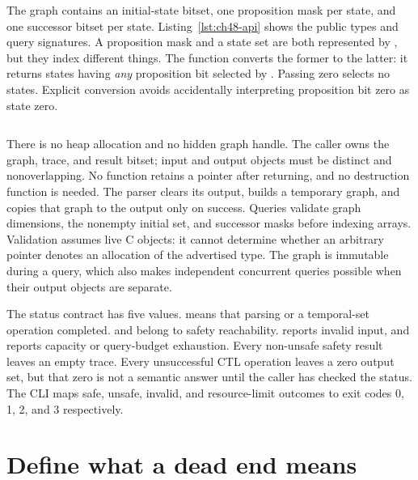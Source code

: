 The graph contains an initial-state bitset, one proposition mask per state, and one successor bitset per state.
Listing~\ref{lst:ch48-api} shows the public types and query signatures.
A proposition mask and a state set are both represented by , but they index different things.
The function  converts the former to the latter: it returns states having \emph{any} proposition bit selected by .
Passing zero selects no states.
Explicit conversion avoids accidentally interpreting proposition bit zero as state zero.

\begin{listing}[htbp]
  \inputminted[firstline=9,lastline=32]{c}{example-code/model-checker/checker.h}
  \caption{Caller-owned fixed-size objects make graph and trace lifetimes explicit.}
  \label{lst:ch48-api}
\end{listing}

There is no heap allocation and no hidden graph handle.
The caller owns the graph, trace, and result bitset; input and output objects must be distinct and nonoverlapping.
No function retains a pointer after returning, and no destruction function is needed.
The parser clears its output, builds a temporary graph, and copies that graph to the output only on success.
Queries validate graph dimensions, the nonempty initial set, and successor masks before indexing arrays.
Validation assumes live C objects: it cannot determine whether an arbitrary pointer denotes an allocation of the advertised type.
The graph is immutable during a query, which also makes independent concurrent queries possible when their output objects are separate.

The status contract has five values.
 means that parsing or a temporal-set operation completed.
 and  belong to safety reachability.
 reports invalid input, and  reports capacity or query-budget exhaustion.
Every non-unsafe safety result leaves an empty trace.
Every unsuccessful CTL operation leaves a zero output set, but that zero is not a semantic answer until the caller has checked the status.
The CLI maps safe, unsafe, invalid, and resource-limit outcomes to exit codes 0, 1, 2, and 3 respectively.

\section{Define what a dead end means}
\label{sec:ch48-totalization}


